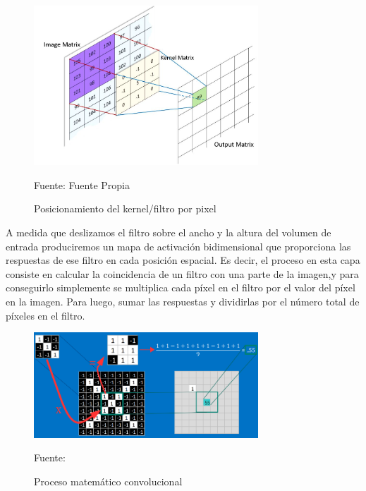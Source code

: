 		\begin{figure}[H]
		\begin{center}
		\includegraphics[width=0.75\textwidth]{images/marcoteorico/Convolution_calculation1}
		\end{center}
		\begin{center}
		\caption{\small{Posicionamiento del kernel/filtro por pixel}}
		{\small{Fuente: Fuente Propia}}
		\end{center}
		\vspace{-1.9em}
		\end{figure}

		A medida que deslizamos el filtro sobre el ancho y la altura del volumen de entrada produciremos un mapa de activación bidimensional que proporciona las respuestas de ese filtro en cada posición espacial. Es decir, el proceso en esta capa consiste en calcular la coincidencia de un filtro con una parte de la imagen,y para conseguirlo simplemente se multiplica cada píxel en el filtro por el valor del píxel en la imagen. Para luego, sumar las respuestas y dividirlas por el número total de píxeles en el filtro.

		\begin{figure}[H]
		\begin{center}
		\includegraphics[width=0.75\textwidth]{images/marcoteorico/conv_filt1}
		\end{center}
		\begin{center}
		\caption{\small{Proceso matemático convolucional}}
		{\small{Fuente:\citep{Rohrer}}}
		\end{center}
		\vspace{-1.5em}
		\end{figure}

